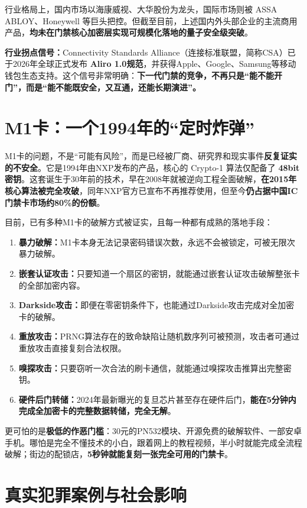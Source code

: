 行业格局上，国内市场以海康威视、大华股份为龙头，国际市场则被 ASSA ABLOY、Honeywell 等巨头把控。但截至目前，上述国内外头部企业的主流商用产品，\textbf{均未在门禁核心加密层实现可规模化落地的量子安全级突破}。

\textbf{行业拐点信号：}Connectivity Standards Alliance（连接标准联盟，简称CSA）已于2026年全球正式发布 \textbf{Aliro 1.0规范}，并获得Apple、Google、Samsung等移动钱包生态支持。这个信号非常明确：\textbf{下一代门禁的竞争，不再只是“能不能开门”，而是“能不能既安全，又互通，还能长期演进”。}

\section{M1卡：一个1994年的“定时炸弹”}

M1卡的问题，不是“可能有风险”，而是已经被厂商、研究界和现实事件\textbf{反复证实的不安全}。它是1994年由NXP发布的产品，核心的 Crypto-1 算法仅配备了 \textbf{48bit 密钥}。这套诞生于30年前的技术，早在2008年就被逆向工程全面破解，\textbf{在2015年核心算法被完全攻破}，同年NXP官方已宣布不再推荐使用，但至今\textbf{仍占据中国IC门禁卡市场约80\%的份额}。

目前，已有多种M1卡的破解方式被证实，且每一种都有成熟的落地手段：
\begin{enumerate}
	\item \textbf{暴力破解：}M1卡本身无法记录密码错误次数，永远不会被锁定，可被无限次暴力破解。
	\item \textbf{嵌套认证攻击：}只要知道一个扇区的密钥，就能通过嵌套认证攻击破解整张卡的全部加密内容。
	\item \textbf{Darkside攻击：}即便在零密钥条件下，也能通过Darkside攻击完成对全加密卡的破解。
	\item \textbf{重放攻击：}PRNG算法存在的致命缺陷让随机数序列可被预测，攻击者可通过重放攻击直接复刻合法权限。
	\item \textbf{嗅探攻击：}只要窃听一次合法的刷卡通信，就能通过嗅探攻击推算出完整密钥。
	\item \textbf{硬件后门转储：}2024年最新曝光的复旦芯片甚至存在硬件后门，\textbf{能在5分钟内完成全加密卡的完整数据转储，完全无解}。
\end{enumerate}

更可怕的是\textbf{极低的作恶门槛}：30元的PN532模块、开源免费的破解软件、一部安卓手机。哪怕是完全不懂技术的小白，跟着网上的教程视频，半小时就能完成全流程破解；街边的配锁店，\textbf{5秒钟就能复刻一张完全可用的门禁卡}。

\section{真实犯罪案例与社会影响}

